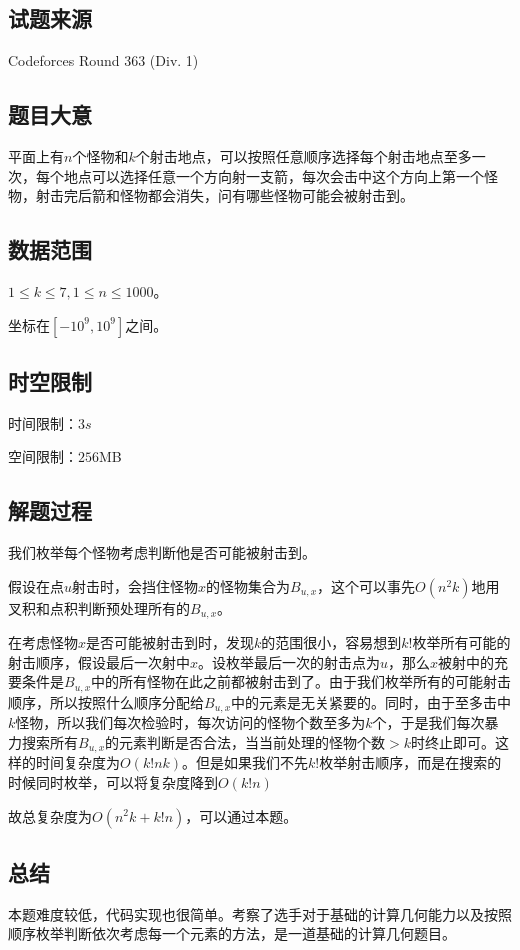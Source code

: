 \documentclass[12pt]{article}
\begin{document}
\subsection{试题来源}
Codeforces Round 363 (Div. 1)

\subsection{题目大意}

平面上有$n$个怪物和$k$个射击地点，可以按照任意顺序选择每个射击地点至多一次，每个地点可以选择任意一个方向射一支箭，每次会击中这个方向上$\textbf{第一个}$怪物，射击完后箭和怪物都会消失，问有哪些怪物可能会被射击到。

\subsection{数据范围}
$1\le k\le 7,1\le n\le 1000$。

坐标在$[-10^9,10^9]$之间。

\subsection{时空限制}
时间限制：$3s$

空间限制：$256$MB

\subsection{解题过程}
我们枚举每个怪物考虑判断他是否可能被射击到。

假设在点$u$射击时，会挡住怪物$x$的怪物集合为$B_{u,x}$，这个可以事先$O(n^2k)$地用叉积和点积判断预处理所有的$B_{u,x}$。

在考虑怪物$x$是否可能被射击到时，发现$k$的范围很小，容易想到$k!$枚举所有可能的射击顺序，假设最后一次射中$x$。设枚举最后一次的射击点为$u$，那么$x$被射中的充要条件是$B_{u, x}$中的所有怪物在此之前都被射击到了。由于我们枚举所有的可能射击顺序，所以按照什么顺序分配给$B_{u,x}$中的元素是无关紧要的。同时，由于至多击中$k$怪物，所以我们每次检验时，每次访问的怪物个数至多为$k$个，于是我们每次暴力搜索所有$B_{u,x}$的元素判断是否合法，当当前处理的怪物个数$>k$时终止即可。这样的时间复杂度为$O(k!nk)$。但是如果我们不先$k!$枚举射击顺序，而是在搜索的时候同时枚举，可以将复杂度降到$O(k!n)$

故总复杂度为$O(n^2k+k!n)$，可以通过本题。

\subsection{总结}
本题难度较低，代码实现也很简单。考察了选手对于基础的计算几何能力以及按照顺序枚举判断依次考虑每一个元素的方法，是一道基础的计算几何题目。
\end{document}
